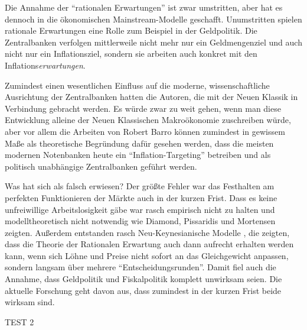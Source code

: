 Die Annahme der "`rationalen Erwartungen"' ist zwar umstritten, aber hat es dennoch in die ökonomischen Mainstream-Modelle geschafft. Unumstritten spielen rationale Erwartungen eine Rolle zum Beispiel in der Geldpolitik. Die Zentralbanken verfolgen mittlerweile nicht mehr nur ein Geldmengenziel und auch nicht nur ein Inflationsziel, sondern sie arbeiten auch konkret mit den Inflations\textit{erwartungen}.

Zumindest einen wesentlichen Einfluss auf die moderne, wissenschaftliche Ausrichtung der Zentralbanken hatten die Autoren, die mit der Neuen Klassik in Verbindung gebracht werden. Es würde zwar zu weit gehen, wenn man diese Entwicklung alleine der Neuen Klassischen Makroökonomie zuschreiben würde, aber vor allem die Arbeiten von Robert Barro können zumindest in gewissem Maße als theoretische Begründung dafür gesehen werden, dass die meisten modernen Notenbanken heute ein "`Inflation-Targeting"' betreiben und als politisch unabhängige Zentralbanken geführt werden.


Was hat sich als falsch erwiesen? Der größte Fehler war das Festhalten am perfekten Funktionieren der Märkte auch in der kurzen Frist. Dass es keine unfreiwillige Arbeitslosigkeit gäbe war rasch empirisch nicht zu halten und modelltheoretisch nicht notwendig wie Diamond, Pissaridis und Mortensen zeigten. Außerdem entstanden rasch Neu-Keynesianische Modelle , die zeigten, dass die Theorie der Rationalen Erwartung auch dann aufrecht erhalten werden kann, wenn sich Löhne und Preise nicht sofort an das Gleichgewicht anpassen, sondern langsam über mehrere "`Entscheidungsrunden"'. Damit fiel auch die Annahme, dass Geldpolitik und Fiskalpolitik komplett unwirksam seien. Die aktuelle Forschung geht davon aus, dass zumindest in der kurzen Frist beide wirksam sind.

TEST 2




